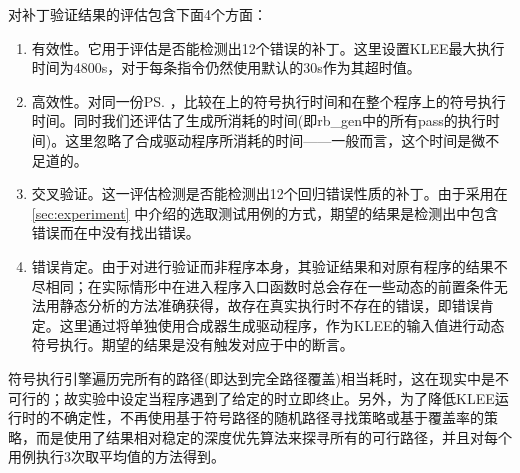 对\dryrun 补丁验证结果的评估包含下面4个方面：
\begin{enumerate}
\item 有效性。它用于评估\dryrun 是否能检测出12个错误的补丁。这里设置KLEE最大执行时间为4800s，对于每条指令仍然使用默认的30s作为其超时值。
\item 高效性。对同一份\patch\ps ，比较在\rbscope 上的符号执行时间和在整个程序上的符号执行时间。同时我们还评估了\rbscope 生成所消耗的时间(即rb\_gen中的所有pass的执行时间)。这里忽略了合成驱动程序所消耗的时间——一般而言，这个时间是微不足道的。
\item 交叉验证。这一评估检测\dryrun 是否能检测出12个回归错误性质的补丁。由于采用在 \autoref{sec:experiment} 中介绍的选取测试用例的方式，\dryrun 期望的结果是检测出\patch 中包含错误而在\bug 中没有找出错误。
\item 错误肯定。由于\dryrun 对\rbscope 进行验证而非程序本身，其验证结果和对原有程序的结果不尽相同；在实际情形中在进入程序入口函数时总会存在一些动态的前置条件无法用静态分析的方法准确获得，故存在真实执行时不存在的错误，即错误肯定。这里通过将\bug\scope 单独使用合成器生成驱动程序，作为KLEE的输入值进行动态符号执行。期望的结果是没有触发对应于\bug 中的断言。
\end{enumerate}
符号执行引擎遍历完所有的路径(即达到完全路径覆盖)相当耗时，这在现实中是不可行的；故实验中设定当程序遇到了给定的\prog\ass 时立即终止。另外，为了降低KLEE运行时的不确定性，不再使用基于符号路径的随机路径寻找策略或基于覆盖率的策略，而是使用了结果相对稳定的深度优先算法来探寻所有的可行路径，并且对每个用例执行3次取平均值的方法得到。

